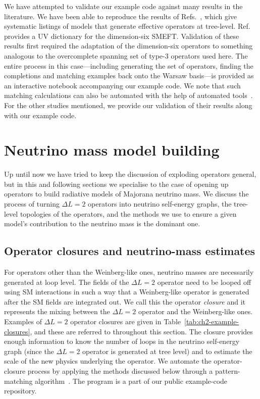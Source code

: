 We have attempted to validate our example code against many results in the
literature. We have been able to reproduce the results of
Refs.~\cite{delAguila:2012nu, Cai:2014kra, Herrero-Garcia:2016uab,
  deBlas:2017xtg, deGouvea:2019xzm}, which give systematic listings of models
that generate effective operators at tree-level. Ref.~\cite{deBlas:2017xtg}
provides a UV dictionary for the dimension-six SMEFT. Validation of these
results first required the adaptation of the dimension-six operators to
something analogous to the overcomplete spanning set of type-3 operators used
here. The entire process in this case---including generating the set of
operators, finding the completions and matching examples back onto the Warsaw
basis---is provided as an interactive notebook accompanying our example code. We
note that such matching calculations can also be automated with the help of
automated tools~\cite{Criado:2017khh, Bakshi:2018ics}. For the other studies
mentioned, we provide our validation of their results along with our example
code.

\section{Neutrino mass model building}
\label{sec:ch2-modelbuilding}

Up until now we have tried to keep the discussion of exploding operators
general, but in this and following sections we specialise to the case of opening
up operators to build radiative models of Majorana neutrino mass. We discuss the
process of turning $\Delta L = 2$ operators into neutrino self-energy graphs,
the tree-level topologies of the operators, and the methods we use to ensure a
given model's contribution to the neutrino mass is the dominant one.

\subsection{Operator closures and neutrino-mass estimates}
\label{sec:ch2-operator-closures}

For operators other than the Weinberg-like ones, neutrino masses are necessarily
generated at loop level. The fields of the $\Delta L = 2$ operator need to be
looped off using SM interactions in such a way that a Weinberg-like operator is
generated after the SM fields are integrated out. We call this the operator
\textit{closure} and it represents the mixing between the $\Delta L = 2$
operator and the Weinberg-like ones. Examples of $\Delta L = 2$ operator
closures are given in Table~\ref{tab:ch2-example-closures}, and these are referred
to throughout this section. The closure provides enough information to know the
number of loops in the neutrino self-energy graph (since the $\Delta L = 2$
operator is generated at tree level) and to estimate the scale of the new
physics underlying the operator. We automate the operator-closure process by
applying the methods discussed below through a pattern-matching
algorithm~\cite{krebber2018, krebber2017nonlinear}. The program is a part of our
public example-code repository.


